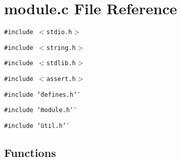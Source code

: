 \section{module.c File Reference}
\label{module_8c}
{\tt \#include $<$stdio.h$>$}\par
{\tt \#include $<$string.h$>$}\par
{\tt \#include $<$stdlib.h$>$}\par
{\tt \#include $<$assert.h$>$}\par
{\tt \#include \char`\"{}defines.h\char`\"{}}\par
{\tt \#include \char`\"{}module.h\char`\"{}}\par
{\tt \#include \char`\"{}util.h\char`\"{}}\par
\subsection*{Functions}
